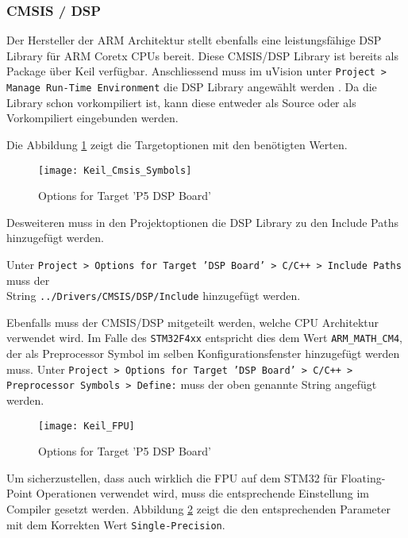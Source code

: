 \subsubsection{CMSIS / DSP}
\label{sec:CMSISDSP}

Der Hersteller der ARM Architektur stellt ebenfalls eine leistungsfähige DSP Library für ARM Coretx CPUs bereit.
Diese CMSIS/DSP Library ist bereits als Package über Keil verfügbar.
Anschliessend muss im uVision unter \texttt{Project > Manage Run-Time Environment} die DSP Library angewählt werden \cite{enable-cmsis-dsp-lib}.
Da die Library schon vorkompiliert ist, kann diese entweder als Source oder als Vorkompiliert eingebunden werden.

Die Abbildung \ref{pic:Keil_Cmsis_Symbols} zeigt die Targetoptionen mit den benötigten Werten.

\begin{figure}[H]
	\centering
	\texttt{[image: Keil\_Cmsis\_Symbols]}
	\caption{Options for Target 'P5 DSP Board'}
	\label{pic:Keil_Cmsis_Symbols}
\end{figure}

Desweiteren muss in den Projektoptionen die DSP Library zu den Include Paths hinzugefügt werden.

Unter \texttt{Project > Options for Target 'DSP Board' > C/C++ > Include Paths} muss der \\
String \texttt{../Drivers/CMSIS/DSP/Include} hinzugefügt werden.

Ebenfalls muss der CMSIS/DSP mitgeteilt werden, welche CPU Architektur verwendet wird. Im Falle des \texttt{STM32F4xx} entspricht dies dem Wert \texttt{ARM\_MATH\_CM4}, der als Preprocessor Symbol im selben Konfigurationsfenster hinzugefügt werden muss.
Unter \texttt{Project > Options for Target 'DSP Board' > C/C++ > Preprocessor Symbols > Define:} muss der oben genannte String angefügt werden.


\begin{figure}[H]
	\centering
	\texttt{[image: Keil\_FPU]}
	\caption{Options for Target 'P5 DSP Board'}
	\label{pic:Keil_FPU}
\end{figure}

Um sicherzustellen, dass auch wirklich die FPU auf dem STM32 für Floating-Point Operationen verwendet wird, muss die entsprechende Einstellung im Compiler gesetzt werden.
Abbildung \ref{pic:Keil_FPU} zeigt die den entsprechenden Parameter mit dem Korrekten Wert \texttt{Single-Precision}.


\newpage